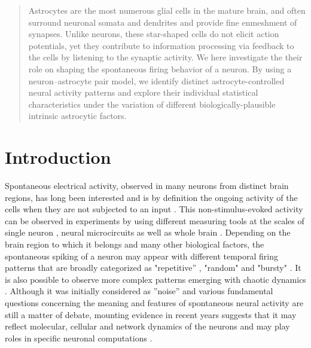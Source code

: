 \documentclass[%
 aip,
 amsmath,amssymb,
 reprint,%
]{revtex4-1}
\begin{document}
\begin{quotation}
Astrocytes are the most numerous glial cells in the mature brain, and often surround neuronal somata and dendrites and provide fine enmeshment of synapses. Unlike neurons, these star-shaped cells do not elicit action potentials, yet they contribute to information processing via feedback to the cells by listening to the synaptic activity. We here investigate the their role on shaping the spontaneous firing behavior of a neuron. By using a neuron–astrocyte pair model, we identify distinct astrocyte-controlled neural activity patterns and explore their individual statistical characteristics under the variation of different biologically-plausible intrinsic astrocytic factors.

\end{quotation}	

\section{Introduction}
	
	Spontaneous electrical activity, observed in many neurons from distinct brain regions, has long been interested and is by definition the ongoing activity of the cells when they are not subjected to an input \cite{Dehaene2005, Redolf2021}. This non-stimulus-evoked activity can be observed in experiments by using different measuring tools at the scales of single neuron \cite{Kubska2021}, neural microcircuits \cite{Yuan2020} as well as whole brain \cite{Fox2007, Calim2021}. Depending on the brain region to which it belongs and many other biological factors, the spontaneous spiking of a neuron may appear with different temporal firing patterns that are broadly categorized as "repetitive'' \cite{Uddin2020}, "random" \cite{Paladini2003} and "bursty" \cite{Yang2018}. It is also possible to observe more complex patterns emerging with chaotic dynamics \cite{Yi2012, Dai2020}. Although it was initially considered as ''noise'' and various fundamental questions concerning the meaning and features of spontaneous neural activity are still a matter of debate, mounting evidence in recent years suggests that it may reflect molecular, cellular and network dynamics of the neurons and may play roles in specific neuronal computations \cite{Ozer2007, Uzuntarla2012, Frolov2020, Guiyang2021, Martini2021}.
	
\end{document}
